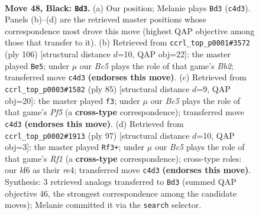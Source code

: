 \documentclass[11pt]{article}
\begin{document}
\clearpage

\begin{figure}[p]\centering
\begin{subfigure}{0.46\textwidth}\centering
\resizebox{\linewidth}{!}{%
\newchessgame
\chessboard[
  setfen={8/1k6/5Kp1/6P1/p1b5/8/8/6b1 b - - 3 48},
  showmover=false,
  pgfstyle=straightmove, color=movearrow, markmove={c4-d3}
]}
\caption{}
\end{subfigure}\hfill
\begin{subfigure}{0.46\textwidth}\centering
\resizebox{\linewidth}{!}{%
\newchessgame
\chessboard[
  setfen={8/6p1/8/5p2/6k1/6P1/1B3K2/8 w - - 0 54},
  showmover=false,
  pgfstyle=straightmove, color=movearrow, markmove={b2-e5}
]}
\caption{}
\end{subfigure}
\\[4pt]
\begin{subfigure}{0.46\textwidth}\centering
\resizebox{\linewidth}{!}{%
\newchessgame
\chessboard[
  setfen={8/6k1/pKP5/8/5p2/1P6/8/8 b - - 0 43},
  showmover=false,
  pgfstyle=straightmove, color=movearrow, markmove={f4-f3}
]}
\caption{}
\end{subfigure}\hfill
\begin{subfigure}{0.46\textwidth}\centering
\resizebox{\linewidth}{!}{%
\newchessgame
\chessboard[
  setfen={5r2/8/7p/2k5/p3R3/2K5/1P6/8 b - - 1 49},
  showmover=false,
  pgfstyle=straightmove, color=movearrow, markmove={f8-f3}
]}
\caption{}
\end{subfigure}
\caption{\textbf{Move 48, Black: \texttt{Bd3}.} (a) Our position; Melanie plays \texttt{Bd3} (\texttt{c4d3}). Panels (b)--(d) are the retrieved master positions whose correspondence most drove this move (highest QAP objective among those that transfer to it). (b) Retrieved from \texttt{ccrl\_top\_p0001\#3572} (ply 106) [structural distance $d$=10, QAP obj=22]: the master played \texttt{Be5}; under $\mu$ our \emph{Bc5} plays the role of that game's \emph{Bb2}; transferred move \texttt{c4d3} \textbf{(endorses this move)}. (c) Retrieved from \texttt{ccrl\_top\_p0003\#1582} (ply 85) [structural distance $d$=9, QAP obj=20]: the master played \texttt{f3}; under $\mu$ our \emph{Bc5} plays the role of that game's \emph{Pf5} (a \textbf{cross-type} correspondence); transferred move \texttt{c4d3} \textbf{(endorses this move)}. (d) Retrieved from \texttt{ccrl\_top\_p0002\#1913} (ply 97) [structural distance $d$=10, QAP obj=3]: the master played \texttt{Rf3+}; under $\mu$ our \emph{Bc5} plays the role of that game's \emph{Rf1} (a \textbf{cross-type} correspondence); cross-type roles: our \emph{k}f6 as their \emph{r}e4; transferred move \texttt{c4d3} \textbf{(endorses this move)}. Synthesis: 3 retrieved analogs transferred to \texttt{Bd3} (summed QAP objective 46, the strongest correspondence among the candidate moves); Melanie committed it via the \texttt{search} selector.}
\label{fig:thought-m95}
\end{figure}
\end{document}
